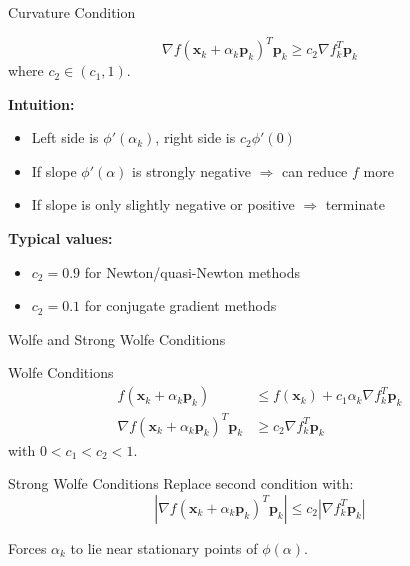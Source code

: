 \documentclass[aspectratio=1610]{beamer}
\begin{document}
\begin{frame}{Curvature Condition}
  \begin{definition}
    $$\nabla f(\mathbf{x}_k + \alpha_k \mathbf{p}_k)^T \mathbf{p}_k \geq c_2 \nabla f_k^T \mathbf{p}_k$$
    where $c_2 \in (c_1, 1)$.
  \end{definition}
  
  \vspace{0.3cm}
  
  \textbf{Intuition:}
  \begin{itemize}
    \item Left side is $\phi'(\alpha_k)$, right side is $c_2 \phi'(0)$
    \item If slope $\phi'(\alpha)$ is strongly negative $\Rightarrow$ can reduce $f$ more
    \item If slope is only slightly negative or positive $\Rightarrow$ terminate
  \end{itemize}
  
  \vspace{0.3cm}
  
  \textbf{Typical values:}
  \begin{itemize}
    \item $c_2 = 0.9$ for Newton/quasi-Newton methods
    \item $c_2 = 0.1$ for conjugate gradient methods
  \end{itemize}
\end{frame}

\begin{frame}{Wolfe and Strong Wolfe Conditions}
  \begin{block}{Wolfe Conditions}
    \begin{align}
      f(\mathbf{x}_k + \alpha_k \mathbf{p}_k) &\leq f(\mathbf{x}_k) + c_1 \alpha_k \nabla f_k^T \mathbf{p}_k \\
      \nabla f(\mathbf{x}_k + \alpha_k \mathbf{p}_k)^T \mathbf{p}_k &\geq c_2 \nabla f_k^T \mathbf{p}_k
    \end{align}
    with $0 < c_1 < c_2 < 1$.
  \end{block}
  
  \vspace{0.3cm}
  
  \begin{block}{Strong Wolfe Conditions}
    Replace second condition with:
    $$|\nabla f(\mathbf{x}_k + \alpha_k \mathbf{p}_k)^T \mathbf{p}_k| \leq c_2 |\nabla f_k^T \mathbf{p}_k|$$
    
    Forces $\alpha_k$ to lie near stationary points of $\phi(\alpha)$.
  \end{block}
\end{frame}
\end{document}
